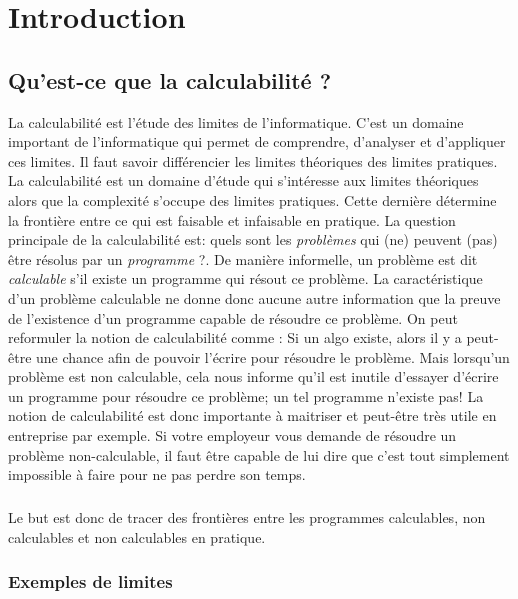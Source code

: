 
\chapter{Introduction}
\label{ch:introduction}

\section{Qu'est-ce que la calculabilité ?}
\label{sec:qu_est-ce_la_calculabilite}

La calculabilité est l'étude des limites de l'informatique. C'est un domaine important de l'informatique qui permet de comprendre, d'analyser et d'appliquer ces limites.
Il faut savoir différencier les limites théoriques des limites
pratiques. La calculabilité est un domaine d'étude qui s'intéresse aux limites théoriques alors que
la complexité s'occupe des limites pratiques. Cette dernière
détermine la frontière entre ce qui est faisable et infaisable en pratique.
La question principale de la calculabilité est: \og quels sont les \textit{problèmes} qui (ne) peuvent (pas)
être résolus par un \textit{programme} ?\fg.  De manière informelle, un problème est dit \emph{calculable} s'il existe un programme qui résout ce problème.  La caractéristique d'un problème calculable ne donne donc aucune
autre information que la preuve de l'existence d'un programme capable de résoudre ce problème. On peut reformuler la notion de calculabilité comme : Si un algo existe, alors il y a peut-être une chance afin de pouvoir l'écrire pour résoudre le problème.  Mais lorsqu'un problème est non calculable, cela nous informe qu'il est inutile d'essayer d'écrire un programme pour résoudre ce problème; un tel programme n'existe pas!
La notion de calculabilité est donc importante à maitriser et peut-être très utile en entreprise par exemple. Si votre employeur vous demande de résoudre un problème non-calculable, il faut être capable de lui dire que c'est tout simplement impossible à faire pour ne pas perdre son temps.

\paragraph{} Le but est donc de tracer des frontières entre les programmes calculables,
non calculables et non calculables en pratique.

\subsection{Exemples de limites}
\label{subsec:exemples_limites}

